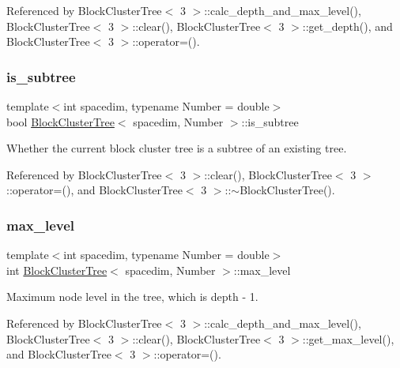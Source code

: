 Referenced by Block\+Cluster\+Tree$<$ 3 $>$\+::calc\+\_\+depth\+\_\+and\+\_\+max\+\_\+level(), Block\+Cluster\+Tree$<$ 3 $>$\+::clear(), Block\+Cluster\+Tree$<$ 3 $>$\+::get\+\_\+depth(), and Block\+Cluster\+Tree$<$ 3 $>$\+::operator=().

\mbox{\label{classBlockClusterTree_a8dc01af98989bb71246fa2cd4d7307da}} 
\subsubsection{\texorpdfstring{is\+\_\+subtree}{is\_subtree}}
{\footnotesize\ttfamily template$<$int spacedim, typename Number = double$>$ \\
bool \hyperlink{classBlockClusterTree}{Block\+Cluster\+Tree}$<$ spacedim, Number $>$\+::is\+\_\+subtree\hspace{0.3cm}{\ttfamily [private]}}

Whether the current block cluster tree is a subtree of an existing tree. 

Referenced by Block\+Cluster\+Tree$<$ 3 $>$\+::clear(), Block\+Cluster\+Tree$<$ 3 $>$\+::operator=(), and Block\+Cluster\+Tree$<$ 3 $>$\+::$\sim$\+Block\+Cluster\+Tree().

\mbox{\label{classBlockClusterTree_a9151f138713d01c53ac17f004c7e6b62}} 
\subsubsection{\texorpdfstring{max\+\_\+level}{max\_level}}
{\footnotesize\ttfamily template$<$int spacedim, typename Number = double$>$ \\
int \hyperlink{classBlockClusterTree}{Block\+Cluster\+Tree}$<$ spacedim, Number $>$\+::max\+\_\+level\hspace{0.3cm}{\ttfamily [private]}}

Maximum node level in the tree, which is {\ttfamily depth} -\/ 1. 

Referenced by Block\+Cluster\+Tree$<$ 3 $>$\+::calc\+\_\+depth\+\_\+and\+\_\+max\+\_\+level(), Block\+Cluster\+Tree$<$ 3 $>$\+::clear(), Block\+Cluster\+Tree$<$ 3 $>$\+::get\+\_\+max\+\_\+level(), and Block\+Cluster\+Tree$<$ 3 $>$\+::operator=().

